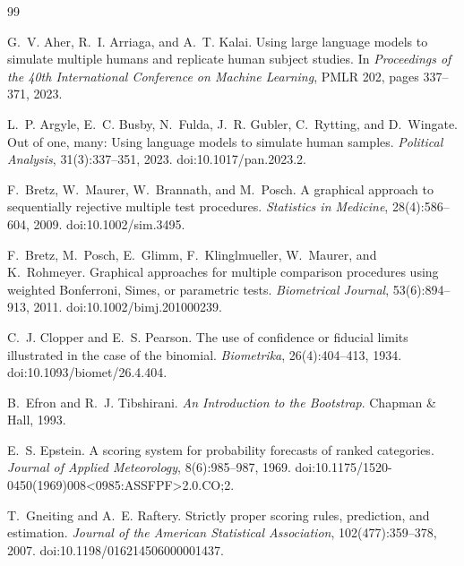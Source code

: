 \documentclass[11pt]{article}
\begin{document}
\begin{thebibliography}{99}

G.~V. Aher, R.~I. Arriaga, and A.~T. Kalai.
\newblock Using large language models to simulate multiple humans and replicate human subject studies.
\newblock In \emph{Proceedings of the 40th International Conference on Machine Learning}, PMLR 202, pages 337--371, 2023.

L.~P. Argyle, E.~C. Busby, N.~Fulda, J.~R. Gubler, C.~Rytting, and D.~Wingate.
\newblock Out of one, many: Using language models to simulate human samples.
\newblock \emph{Political Analysis}, 31(3):337--351, 2023.
\newblock doi:10.1017/pan.2023.2.

F.~Bretz, W.~Maurer, W.~Brannath, and M.~Posch.
\newblock A graphical approach to sequentially rejective multiple test procedures.
\newblock \emph{Statistics in Medicine}, 28(4):586--604, 2009.
\newblock doi:10.1002/sim.3495.

F.~Bretz, M.~Posch, E.~Glimm, F.~Klinglmueller, W.~Maurer, and K.~Rohmeyer.
\newblock Graphical approaches for multiple comparison procedures using weighted {B}onferroni, {S}imes, or parametric tests.
\newblock \emph{Biometrical Journal}, 53(6):894--913, 2011.
\newblock doi:10.1002/bimj.201000239.

C.~J. Clopper and E.~S. Pearson.
\newblock The use of confidence or fiducial limits illustrated in the case of the binomial.
\newblock \emph{Biometrika}, 26(4):404--413, 1934.
\newblock doi:10.1093/biomet/26.4.404.

B.~Efron and R.~J. Tibshirani.
\newblock \emph{An Introduction to the Bootstrap}.
\newblock Chapman \& Hall, 1993.

E.~S. Epstein.
\newblock A scoring system for probability forecasts of ranked categories.
\newblock \emph{Journal of Applied Meteorology}, 8(6):985--987, 1969.
\newblock doi:10.1175/1520-0450(1969)008<0985:ASSFPF>2.0.CO;2.

T.~Gneiting and A.~E. Raftery.
\newblock Strictly proper scoring rules, prediction, and estimation.
\newblock \emph{Journal of the American Statistical Association}, 102(477):359--378, 2007.
\newblock doi:10.1198/016214506000001437.


\end{thebibliography}
\end{document}
